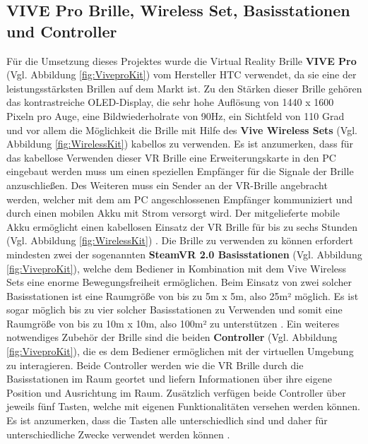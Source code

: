 \subsection{VIVE Pro Brille, Wireless Set, Basisstationen und Controller}\label{sec:GrundHardware}
Für die Umsetzung dieses Projektes wurde die Virtual Reality Brille \textbf{VIVE Pro} (Vgl. Abbildung \ref{fig:ViveproKit}) vom Hersteller HTC verwendet, da sie eine der leistungsstärksten Brillen auf dem Markt ist. Zu den Stärken dieser Brille gehören das kontrastreiche OLED-Display, die sehr hohe Auflösung von 1440 x 1600 Pixeln pro Auge, eine Bildwiederholrate von 90Hz, ein Sichtfeld von 110 Grad und vor allem die Möglichkeit die Brille mit Hilfe des \textbf{Vive Wireless Sets} (Vgl. Abbildung \ref{fig:WirelessKit}) kabellos zu verwenden. Es ist anzumerken, dass für das kabellose Verwenden dieser VR Brille eine Erweiterungskarte in den PC eingebaut werden muss um einen speziellen Empfänger für die Signale der Brille anzuschließen. Des Weiteren muss ein Sender an der VR-Brille angebracht werden, welcher mit dem am PC angeschlossenen Empfänger kommuniziert und durch einen mobilen Akku mit Strom versorgt wird. Der mitgelieferte mobile Akku ermöglicht einen kabellosen Einsatz der VR Brille für bis zu sechs Stunden (Vgl. Abbildung \ref{fig:WirelessKit}) \cite{28}.
\newline
Die Brille zu verwenden zu können erfordert mindesten zwei der sogenannten \textbf{SteamVR 2.0 Basisstationen} (Vgl. Abbildung \ref{fig:ViveproKit}), welche dem Bediener in Kombination mit dem Vive Wireless Sets eine enorme Bewegungsfreiheit ermöglichen. Beim Einsatz von zwei solcher Basisstationen ist eine Raumgröße von bis zu 5m x 5m, also 25m² möglich. Es ist sogar möglich bis zu vier solcher Basisstationen zu Verwenden und somit eine Raumgröße von bis zu 10m x 10m, also 100m² zu unterstützen \cite{28}.
\newline
Ein weiteres notwendiges Zubehör der Brille sind die beiden \textbf{Controller} (Vgl. Abbildung \ref{fig:ViveproKit}), die es dem Bediener ermöglichen mit der virtuellen Umgebung zu interagieren. Beide Controller werden wie die VR Brille durch die Basisstationen im Raum geortet und liefern Informationen über ihre eigene Position und Ausrichtung im Raum. Zusätzlich verfügen beide Controller über jeweils fünf Tasten, welche mit eigenen Funktionalitäten versehen werden können. Es ist anzumerken, dass die Tasten alle unterschiedlich sind und daher für unterschiedliche Zwecke verwendet werden können \cite{29}.
\newline
